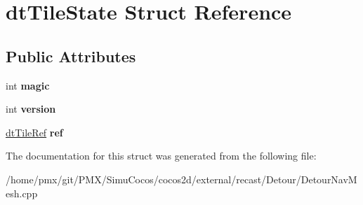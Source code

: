 \hypertarget{structdtTileState}{}\section{dt\+Tile\+State Struct Reference}
\label{structdtTileState}
\subsection*{Public Attributes}
\begin{DoxyCompactItemize}
\item 
\mbox{\label{structdtTileState_ad1d40a5f3e34dcd3b0cd5e52a1929e15}} 
int {\bfseries magic}
\item 
\mbox{\label{structdtTileState_ad24ddf11608ec1f0b43f676a2437483f}} 
int {\bfseries version}
\item 
\mbox{\label{structdtTileState_a5c3602092e22491b52974d478e229cd0}} 
\hyperlink{group__detour_ga7ea56cfe01bd7c34a81d821d94cbeea5}{dt\+Tile\+Ref} {\bfseries ref}
\end{DoxyCompactItemize}


The documentation for this struct was generated from the following file\+:\begin{DoxyCompactItemize}
\item 
/home/pmx/git/\+P\+M\+X/\+Simu\+Cocos/cocos2d/external/recast/\+Detour/Detour\+Nav\+Mesh.\+cpp\end{DoxyCompactItemize}
